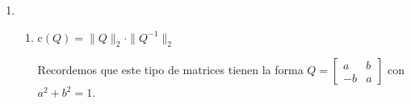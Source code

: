 \begin{enumerate}[label=\color{red}\textbf{\arabic*)}, leftmargin=*]
	$0=\begin{bmatrix}
			\sqrt{2}_{45^\circ} & \vec{V}_1& 0 \\
			5_{270^\circ }& 0& 3_{180^\circ} \\
			0 & 5_{45^\circ} & 1_{0^\circ}
		\end{bmatrix}=-(5_{45^\circ}\cdot3_{180^\circ}\cdot\sqrt{2}_{45^\circ}+1\cdot5_{270^\circ}\cdot\vec{V}_1)=-15\sqrt{2}_{270^\circ}-5_{270^\circ}\cdot\vec{V}_1$

	Despejando: \[
		\vec{V}_1=\dfrac{-15\sqrt{2}_{270^\circ}}{5_{270^\circ}}=\dfrac{15\sqrt{2}_{270^\circ}\cdot1_{180^\circ}}{5_{270^\circ}}=3\sqrt{2}_{180^\circ}=\bboxed{-3\sqrt{2}}
	\]
	\item {}
	\begin{enumerate}[label=\color{red}\alph*)]
		\item {}

		$\mathrm{c}(Q)=\|Q\|_2\cdot\|Q^{-1}\|_2$

		Recordemos que este tipo de matrices tienen la forma $Q=\begin{bmatrix}
				a& b \\
				-b & a
			\end{bmatrix}$ con $a^2+b^2=1$.


\end{enumerate}
\end{enumerate}
